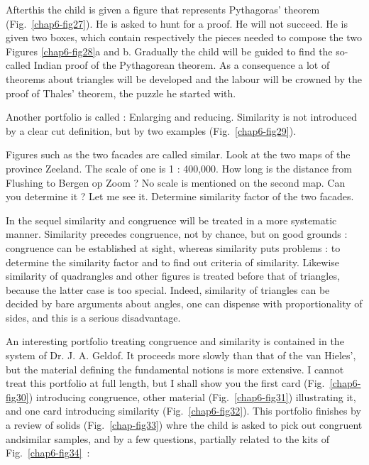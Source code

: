 \setcounter{pageoriginal}{94}
After\pageoriginale this the child is given a figure that represents Pythagoras' theorem (Fig.~\ref{chap6-fig27}). He is asked to hunt for a proof. He will not succeed. He is given two boxes, which contain respectively the pieces needed to compose the two Figures \ref{chap6-fig28}a and b. Gradually the child will be guided to find the so-called Indian proof of the Pythagorean theorem. As a consequence a lot of theorems about triangles will be developed and the labour will be crowned by the proof of Thales' theorem, the puzzle he started with.

Another portfolio is called : Enlarging and reducing. Similarity is not introduced by a clear cut definition, but by two examples (Fig.~\ref{chap6-fig29}).

Figures such as the two facades are called similar. Look at the two maps of the province Zeeland. The scale of one is 1 : 400,000. How long is the distance from Flushing to Bergen op Zoom ? No scale is mentioned on the second map. Can you determine it ? Let me see it. Determine similarity factor of the two facades.

In the sequel similarity and congruence will be treated in a more systematic manner. Similarity precedes congruence, not by chance, but on good grounds : congruence can be established at sight, whereas similarity puts problems : to determine the similarity factor and to find out criteria of similarity. Likewise similarity of quadrangles and other figures is treated before that of triangles, because the latter case is too special. Indeed, similarity of triangles can be decided by bare arguments about angles, one can dispense with proportionality of sides, and this is a serious disadvantage.

An interesting portfolio treating congruence and similarity is contained in the system of Dr. J. A. Geldof. It proceeds more slowly than that of the van Hieles', but the material defining the fundamental notions is more extensive. I cannot treat this portfolio at full length, but I shall show you the first card (Fig.~\ref{chap6-fig30}) introducing congruence, other material (Fig.~\ref{chap6-fig31}) illustrating it, and one card introducing similarity (Fig.~\ref{chap6-fig32}). This portfolio finishes by a review of solids (Fig.~\ref{chap-fig33}) whre the child is asked to pick out congruent and\pageoriginale similar samples, and by a few questions, partially related to the kits of Fig.~\ref{chap6-fig34}~:

\eject

